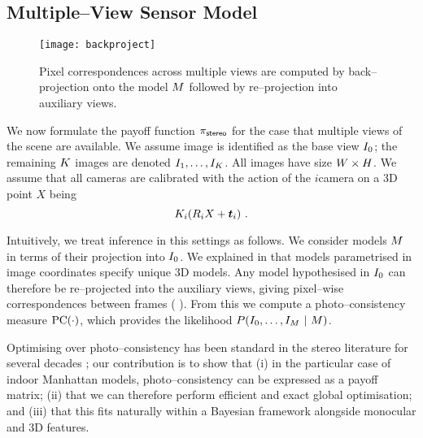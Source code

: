 \subsection{Multiple--View Sensor Model}

\begin{figure}[tb]
  \centering \texttt{[image: backproject]}
  \caption{Pixel correspondences across multiple views are computed by
    back--projection onto the model $\Scene$ followed by re--projection into
    auxiliary views.}
  \label{fig:backproject}
\end{figure}
We now formulate the payoff function $\StereoPayoff$ for the case that
multiple views of the scene are available. We assume 
image is identified as the base view $\Image_0$; the remaining
$\NumViews$ images are denoted
$\Image_1,\ldots,\Image_{\NumViews}$. All images have size
$\Width\times\Height$. We assume that all cameras are calibrated with
the action of the $i$\th camera on a 3D point $X$ being
\begin{equation}
  \CamMatrix_i (\CamR_i X + \CamTr_i) ~.
\end{equation}

Intuitively, we treat inference in this settings as follows. We
consider models $\Scene$ in terms of their projection into
$\Image_0$. We explained in  that models parametrised in
image coordinates specify unique 3D models. Any model hypothesised in
$\Image_0$ can therefore be re--projected into the auxiliary views,
giving pixel--wise correspondences between frames (\cf
{}). From this we compute a photo--consistency
measure $\pc(\cdot)$, which provides the likelihood $P(\StereoData ~|~
\Scene)$.

Optimising over photo--consistency has been standard in the stereo
literature for several decades \cite{Scharstein01}; our contribution
is to show that (i) in the particular case of indoor Manhattan models,
photo--consistency can be expressed as a payoff matrix; (ii) that we
can therefore perform efficient and exact global optimisation; and
(iii) that this fits naturally within a Bayesian framework alongside
monocular and 3D features. 

